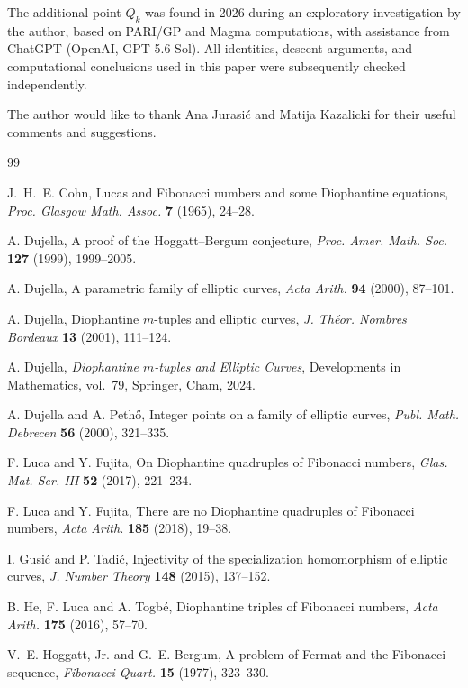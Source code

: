 \documentclass[11pt]{amsart}
\theoremstyle{remark}
\begin{document}
The additional point $Q_k$ was found in 2026 during an exploratory
investigation by the author, based on PARI/GP and Magma computations,
with assistance from ChatGPT (OpenAI, GPT-5.6 Sol).  All identities,
descent arguments, and computational conclusions used in this paper
were subsequently checked independently.

The author would like to thank Ana Jurasi\'c and Matija Kazalicki for their useful comments and suggestions.

\begin{thebibliography}{99}

J.~H.~E. Cohn,
Lucas and Fibonacci numbers and some Diophantine equations,
\emph{Proc. Glasgow Math. Assoc.} \textbf{7} (1965), 24--28.

A. Dujella,
A proof of the Hoggatt--Bergum conjecture,
\emph{Proc. Amer. Math. Soc.} \textbf{127} (1999), 1999--2005.

A. Dujella,
A parametric family of elliptic curves,
\emph{Acta Arith.} \textbf{94} (2000), 87--101.

A. Dujella,
Diophantine $m$-tuples and elliptic curves,
\emph{J. Th\'eor. Nombres Bordeaux} \textbf{13} (2001), 111--124.

A. Dujella,
\emph{Diophantine $m$-tuples and Elliptic Curves},
Developments in Mathematics, vol.~79, Springer, Cham, 2024.

A. Dujella and A. Peth\H{o},
Integer points on a family of elliptic curves,
\emph{Publ. Math. Debrecen} \textbf{56} (2000), 321--335.

F. Luca and Y. Fujita, 
On Diophantine quadruples of Fibonacci numbers, 
\emph{Glas. Mat. Ser. III} \textbf{52} (2017), 221--234.

F. Luca and Y. Fujita, 
There are no Diophantine quadruples of Fibonacci numbers, 
\emph{Acta Arith.} \textbf{185} (2018), 19--38.

I. Gusi\'c and P. Tadi\'c,
Injectivity of the specialization homomorphism of elliptic curves,
\emph{J. Number Theory} \textbf{148} (2015), 137--152.

B. He, F. Luca and A. Togb\'e, 
Diophantine triples of Fibonacci numbers,
\emph{Acta Arith.} \textbf{175} (2016), 57--70. 

V.~E. Hoggatt, Jr. and G.~E. Bergum,
A problem of Fermat and the Fibonacci sequence,
\emph{Fibonacci Quart.} \textbf{15} (1977), 323--330.

\end{thebibliography}
\end{document}
